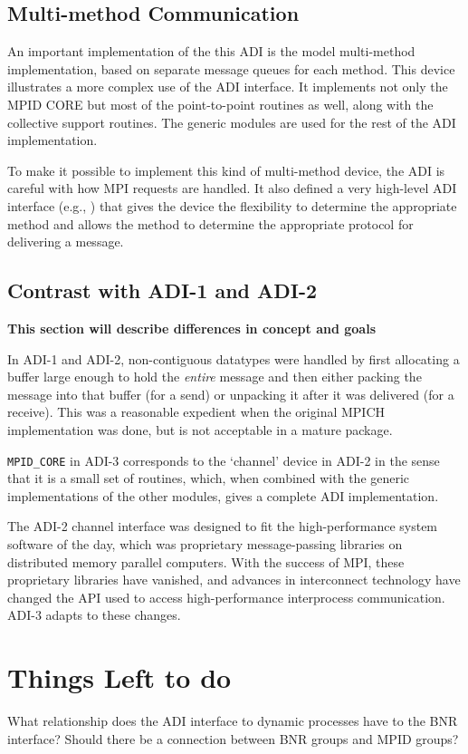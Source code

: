 \documentclass{article}
\begin{document}
\subsection{Multi-method Communication}
An important implementation of the this ADI is the model multi-method
implementation, based on separate message queues for each method.
This device illustrates a more complex use of the ADI interface.  It
implements not only the MPID CORE but most of the point-to-point
routines as well, along with the collective support routines.  The
generic modules are used for the rest of the ADI implementation.

To make it possible to implement this kind of multi-method device, the
ADI is careful with how MPI requests are handled.  It also defined a
very high-level ADI interface (e.g., ) that gives the
device the flexibility to determine the appropriate method and allows
the method to determine the appropriate protocol for delivering a message.

\subsection{Contrast with ADI-1 and ADI-2}
\label{sec-historical}
\textbf{This section will describe differences in concept and goals}

In ADI-1 and ADI-2, non-contiguous datatypes were handled by first
allocating a buffer large enough to hold the \emph{entire} message and
then either packing the message into that buffer (for a send) or
unpacking it after it was delivered (for a receive).  This was a
reasonable expedient when the original MPICH implementation was done,
but is not acceptable in a mature package.

\texttt{MPID_CORE} in ADI-3 corresponds to the `channel' device in ADI-2 in
the sense that it is a small set of routines, which, when combined with the
generic implementations of the other modules, gives a complete ADI
implementation.  

The ADI-2 channel interface was designed to fit the high-performance system
software of the day, which was proprietary message-passing libraries on
distributed memory parallel computers.  With the success of MPI, these
proprietary libraries have vanished, and advances in interconnect technology
have changed the API used to access high-performance interprocess
communication.  ADI-3 adapts to these changes.

\section{Things Left to do}
What relationship does the ADI interface to dynamic processes 
have to the BNR interface?  Should there be a connection between BNR groups
and MPID groups?
\end{document}
